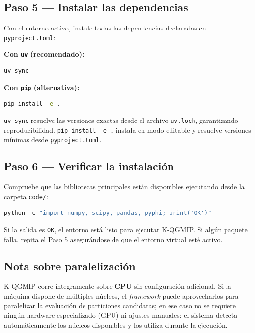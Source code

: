 \subsection{Paso 5 — Instalar las dependencias}

Con el entorno activo, instale todas las dependencias declaradas en \texttt{pyproject.toml}:

\textbf{Con \texttt{uv} (recomendado):}
\begin{lstlisting}[language=bash]
uv sync
\end{lstlisting}

\textbf{Con \texttt{pip} (alternativa):}
\begin{lstlisting}[language=bash]
pip install -e .
\end{lstlisting}

\texttt{uv sync} resuelve las versiones exactas desde el archivo \texttt{uv.lock},
garantizando reproducibilidad. \texttt{pip install -e .} instala en modo editable y
resuelve versiones mínimas desde \texttt{pyproject.toml}.

\subsection{Paso 6 — Verificar la instalación}

Compruebe que las bibliotecas principales están disponibles ejecutando desde la carpeta
\texttt{code/}:

\begin{lstlisting}[language=Python]
python -c "import numpy, scipy, pandas, pyphi; print('OK')"
\end{lstlisting}

Si la salida es \texttt{OK}, el entorno está listo para ejecutar K-QGMIP.
Si algún paquete falla, repita el Paso 5 asegurándose de que el entorno virtual esté activo.

\subsection{Nota sobre paralelización}

K-QGMIP corre íntegramente sobre \textbf{CPU} sin configuración adicional. Si la máquina
dispone de múltiples núcleos, el \textit{framework} puede aprovecharlos para paralelizar
la evaluación de particiones candidatas; en ese caso no se requiere ningún hardware
especializado (GPU) ni ajustes manuales: el sistema detecta automáticamente los núcleos
disponibles y los utiliza durante la ejecución.
